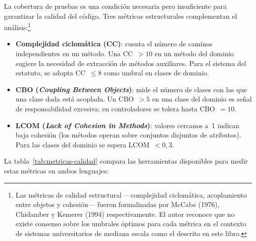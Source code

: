 La cobertura de pruebas es una condición necesaria pero insuficiente para garantizar la
calidad del código. Tres métricas estructurales complementan el análisis:\footnote{Las
métricas de calidad estructural ---complejidad ciclomática, acoplamiento entre objetos y
cohesión--- fueron formalizadas por McCabe (1976), Chidamber y Kemerer (1994) respectivamente.
El autor reconoce que no existe consenso sobre los umbrales óptimos para cada métrica en el
contexto de sistemas universitarios de mediana escala como el descrito en este libro.}

\begin{itemize}
  \item \textbf{Complejidad ciclomática (CC)}: cuenta el número de caminos independientes
        en un método. Una CC~$> 10$ en un método del dominio sugiere la necesidad de
        extracción de métodos auxiliares. Para el sistema del estatuto, se adopta CC~$\leq 8$
        como umbral en clases de dominio.
  \item \textbf{CBO (\textit{Coupling Between Objects})}: mide el número de clases con las
        que una clase dada está acoplada. Un CBO~$> 5$ en una clase del dominio es señal de
        responsabilidad excesiva; en controladores se tolera hasta CBO~$= 10$.
  \item \textbf{LCOM (\textit{Lack of Cohesion in Methods})}: valores cercanos a~1 indican
        baja cohesión (los métodos operan sobre conjuntos disjuntos de atributos). Para
        las clases del dominio se espera LCOM~$< 0{,}3$.
\end{itemize}

La tabla~\ref{tab:metricas-calidad} compara las herramientas disponibles para medir estas
métricas en ambos lenguajes:


